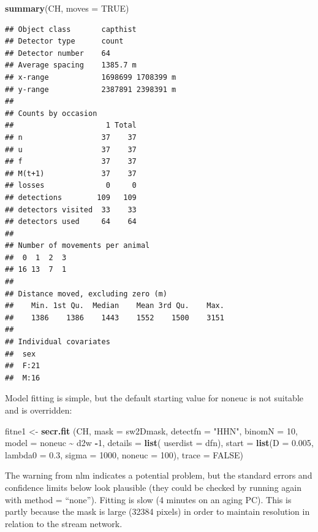 \documentclass[
]{book}
\newenvironment{Shaded}{\begin{snugshade}}{\end{snugshade}}
\newcommand{\AttributeTok}[1]{\textcolor[rgb]{0.13,0.29,0.53}{#1}}
\newcommand{\ConstantTok}[1]{\textcolor[rgb]{0.56,0.35,0.01}{#1}}
\newcommand{\DecValTok}[1]{\textcolor[rgb]{0.00,0.00,0.81}{#1}}
\newcommand{\FloatTok}[1]{\textcolor[rgb]{0.00,0.00,0.81}{#1}}
\newcommand{\FunctionTok}[1]{\textcolor[rgb]{0.13,0.29,0.53}{\textbf{#1}}}
\newcommand{\NormalTok}[1]{#1}
\newcommand{\OtherTok}[1]{\textcolor[rgb]{0.56,0.35,0.01}{#1}}
\newcommand{\SpecialCharTok}[1]{\textcolor[rgb]{0.81,0.36,0.00}{\textbf{#1}}}
\newcommand{\StringTok}[1]{\textcolor[rgb]{0.31,0.60,0.02}{#1}}
\begin{document}
\begin{Shaded}
\begin{Highlighting}[]
\FunctionTok{summary}\NormalTok{(CH, }\AttributeTok{moves =} \ConstantTok{TRUE}\NormalTok{)}
\end{Highlighting}
\end{Shaded}

\begin{verbatim}
## Object class       capthist 
## Detector type      count 
## Detector number    64 
## Average spacing    1385.7 m 
## x-range            1698699 1708399 m 
## y-range            2387891 2398391 m 
## 
## Counts by occasion 
##                     1 Total
## n                  37    37
## u                  37    37
## f                  37    37
## M(t+1)             37    37
## losses              0     0
## detections        109   109
## detectors visited  33    33
## detectors used     64    64
## 
## Number of movements per animal
##  0  1  2  3 
## 16 13  7  1 
## 
## Distance moved, excluding zero (m)
##    Min. 1st Qu.  Median    Mean 3rd Qu.    Max. 
##    1386    1386    1443    1552    1500    3151 
## 
## Individual covariates
##  sex   
##  F:21  
##  M:16
\end{verbatim}

Model fitting is simple, but the default starting value for noneuc is not suitable and is overridden:

\begin{Shaded}
\begin{Highlighting}[]
\NormalTok{fitne1 }\OtherTok{\textless{}{-}} \FunctionTok{secr.fit}\NormalTok{ (CH, }\AttributeTok{mask =}\NormalTok{ sw2Dmask, }\AttributeTok{detectfn =} \StringTok{"HHN"}\NormalTok{, }
    \AttributeTok{binomN =} \DecValTok{10}\NormalTok{, }\AttributeTok{model =}\NormalTok{ noneuc }\SpecialCharTok{\textasciitilde{}}\NormalTok{ d2w }\SpecialCharTok{{-}}\DecValTok{1}\NormalTok{, }\AttributeTok{details =} \FunctionTok{list}\NormalTok{(}
    \AttributeTok{userdist =}\NormalTok{ dfn), }\AttributeTok{start =} \FunctionTok{list}\NormalTok{(}\AttributeTok{D =} \FloatTok{0.005}\NormalTok{, }\AttributeTok{lambda0 =} \FloatTok{0.3}\NormalTok{,}
    \AttributeTok{sigma =} \DecValTok{1000}\NormalTok{, }\AttributeTok{noneuc =} \DecValTok{100}\NormalTok{), }\AttributeTok{trace =} \ConstantTok{FALSE}\NormalTok{)}
\end{Highlighting}
\end{Shaded}

The warning from nlm indicates a potential problem, but the standard errors and confidence limits below look plausible (they could be checked by running again with method = ``none''). Fitting is slow (4 minutes on an aging PC). This is partly because the mask is large (32384 pixels) in order to maintain resolution in relation to the stream network.
\end{document}
